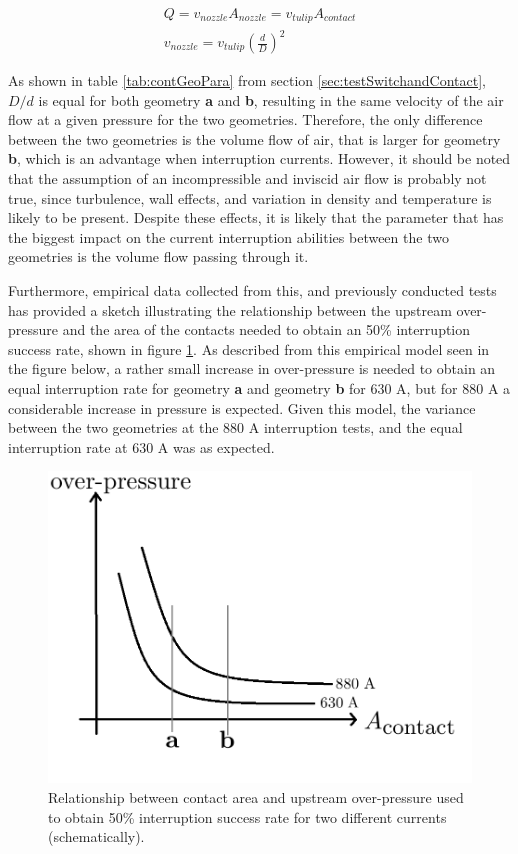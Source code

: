 \documentclass[10pt,b5paper,twoside]{article}
\begin{document}
\begin{equation} \label{nozzle_speed}
\begin{split}
Q=v_{nozzle} A_{nozzle}=v_{tulip} A_{contact} \\
v_{nozzle}=v_{tulip} \left( \frac{d}{D} \right) ^2 \ \ \ \ \ \ \ \ \
\end{split}
\end{equation} 

As shown in table \ref{tab:contGeoPara} from section \ref{sec:testSwitchandContact}, $D/d$ is equal for both geometry \textbf{a} and \textbf{b}, resulting in the same velocity of the air flow at a given pressure for the two geometries. Therefore, the only difference between the two geometries is the volume flow of air, that is larger for geometry \textbf{b}, which is an advantage when interruption currents. However, it should be noted that the assumption of an incompressible and inviscid air flow is probably not true, since turbulence, wall effects, and variation in density and temperature is likely to be present. Despite these effects, it is likely that the parameter that has the biggest impact on the current interruption abilities between the two geometries is the volume flow passing through it.

Furthermore, empirical data collected from this, and previously conducted tests has provided a sketch illustrating the relationship between the upstream over-pressure and the area of the contacts needed to obtain an 50\% interruption success rate, shown in figure \ref{fig:sketch50Intrate}. As described from this empirical model seen in the figure below, a rather small increase in over-pressure is needed to obtain an equal interruption rate for geometry \textbf{a} and geometry \textbf{b} for 630 A, but for 880 A a considerable increase in pressure is expected. Given this model, the variance between the two geometries at the 880 A interruption tests, and the equal interruption rate at 630 A was as expected.

\begin{figure}[H]
\centering
\includegraphics[scale=0.45]{Bilder/Results/pressureVSAcontact2.png}
\caption{Relationship between contact area and upstream over-pressure used to obtain 50\% interruption success rate for two different currents (schematically).} \label{fig:sketch50Intrate}
\end{figure}
\end{document}
